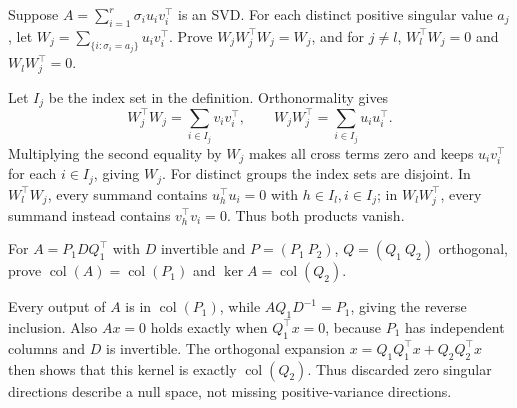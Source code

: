 \begin{problem}
Suppose $A=\sum_{i=1}^r\sigma_i u_iv_i^\top$ is an SVD.
For each distinct positive singular value $a_j$, let
$W_j=\sum_{\{i:\sigma_i=a_j\}}u_iv_i^\top$.
Prove $W_jW_j^\top W_j=W_j$, and for $j\ne l$,
$W_l^\top W_j=0$ and $W_lW_j^\top=0$.
\end{problem}
\begin{solution}
Let $I_j$ be the index set in the definition. Orthonormality gives
\[
W_j^\top W_j=\sum_{i\in I_j}v_iv_i^\top,
\qquad W_jW_j^\top=\sum_{i\in I_j}u_iu_i^\top.
\]
Multiplying the second equality by $W_j$ makes all cross terms zero
and keeps $u_iv_i^\top$ for each $i\in I_j$, giving $W_j$.
For distinct groups the index sets are disjoint. In
$W_l^\top W_j$, every summand contains $u_h^\top u_i=0$ with
$h\in I_l,i\in I_j$; in $W_lW_j^\top$, every summand instead contains
$v_h^\top v_i=0$. Thus both products vanish.
\end{solution}

\begin{problem}
For $A=P_1DQ_1^\top$ with $D$ invertible and $P=(P_1\ P_2)$,
$Q=(Q_1\ Q_2)$ orthogonal, prove
$\operatorname{col}(A)=\operatorname{col}(P_1)$ and
$\ker A=\operatorname{col}(Q_2)$.
\end{problem}
\begin{solution}
Every output of $A$ is in $\operatorname{col}(P_1)$, while
$AQ_1D^{-1}=P_1$, giving the reverse inclusion.
Also $Ax=0$ holds exactly when $Q_1^\top x=0$, because $P_1$ has
independent columns and $D$ is invertible. The orthogonal expansion
$x=Q_1Q_1^\top x+Q_2Q_2^\top x$ then shows that this kernel is exactly
$\operatorname{col}(Q_2)$. Thus discarded zero singular directions
describe a null space, not missing positive-variance directions.
\end{solution}

